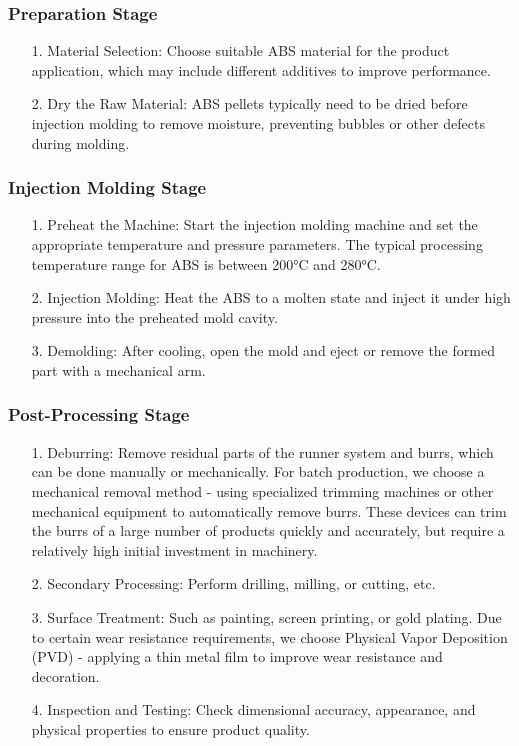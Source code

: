 \documentclass[10pt, a4paper, twocolumn]{article}
\begin{document}
\subsubsection{Preparation Stage}
\begin{itemize}
    \item [1.] Material Selection: Choose suitable ABS material for the product application, which may include different additives to improve performance.
    \item [2.] Dry the Raw Material: ABS pellets typically need to be dried before injection molding to remove moisture, preventing bubbles or other defects during molding.
\end{itemize}

\subsubsection{Injection Molding Stage}
\begin{itemize}
    \item [1.] Preheat the Machine: Start the injection molding machine and set the appropriate temperature and pressure parameters. The typical processing temperature range for ABS is between 200°C and 280°C.
    \item [2.] Injection Molding: Heat the ABS to a molten state and inject it under high pressure into the preheated mold cavity.
    \item [3.] Demolding: After cooling, open the mold and eject or remove the formed part with a mechanical arm.
\end{itemize}

\subsubsection{Post-Processing Stage}
\begin{itemize}
    \item [1.] Deburring: Remove residual parts of the runner system and burrs, which can be done manually or mechanically. For batch production, we choose a mechanical removal method - using specialized trimming machines or other mechanical equipment to automatically remove burrs. These devices can trim the burrs of a large number of products quickly and accurately, but require a relatively high initial investment in machinery.
    \item [2.] Secondary Processing: Perform drilling, milling, or cutting, etc.
    \item [3.] Surface Treatment: Such as painting, screen printing, or gold plating. Due to certain wear resistance requirements, we choose Physical Vapor Deposition (PVD) - applying a thin metal film to improve wear resistance and decoration.
    \item [4.] Inspection and Testing: Check dimensional accuracy, appearance, and physical properties to ensure product quality.
\end{itemize}
\end{document}
